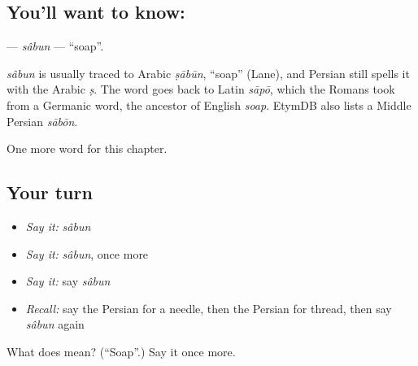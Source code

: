 \subsection*{You'll want to know: }
\textbf{} — \emph{sâbun} — \textquotedblleft{}soap\textquotedblright{}.

\begin{cousinweb}
\emph{sâbun} is usually traced to Arabic \emph{ṣābūn}, \textquotedblleft{}soap\textquotedblright{} (Lane), and Persian still spells it with the Arabic \emph{ṣ}. The word goes back to Latin \emph{sāpō}, which the Romans took from a Germanic word, the ancestor of English \emph{soap}. EtymDB also lists a Middle Persian \emph{sābōn}.
\end{cousinweb}

\begin{grammarlens}[title={What you've built}]
One more word for this chapter.
\end{grammarlens}

\subsection*{Your turn}
\begin{itemize}
\raggedright
  \item \emph{Say it:} \emph{sâbun}
  \item \emph{Say it:} \emph{sâbun}, once more
  \item \emph{Say it:} say \emph{sâbun}
  \item \emph{Recall:} say the Persian for a needle, then the Persian for thread, then say \emph{sâbun} again
\end{itemize}

\begin{tcolorbox}[breakable,colback=teal!4,colframe=teal!35!black,title={Before you move on}]
What does  mean? (\textquotedblleft{}Soap\textquotedblright{}.) Say it once more.
\end{tcolorbox}
